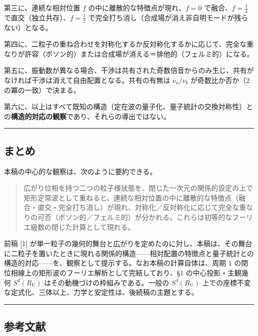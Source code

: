 \documentclass[
]{ltjsarticle}
\begin{document}
第三に、連続な相対位置 \(f\) の中に離散的な特徴点が現れ、\(f=0\)
で融合、\(f=\tfrac14\) で直交（独立共存）、\(f=\tfrac12\)
で完全打ち消し（合成場が消え非自明モードが残らない）となる。

第四に、二粒子の重ね合わせを対称化するか反対称化するかに応じて、完全な重なりが許容（ボソン的）または合成場が消える＝排他的（フェルミ的）になる。

第五に、振動数が異なる場合、干渉は共有された奇数倍音からのみ生じ、共有がなければ干渉は消えて自由配置となる。共有の有無は
\(\nu_a/\nu_b\) が奇数比か否か（\(2\) の冪の一致）で決まる。

第六に、以上はすべて既知の構造（定在波の量子化、量子統計の交換対称性）との\textbf{構造的対応の観察}であり、それらの導出ではない。

\begin{center}\rule{0.5\linewidth}{0.5pt}\end{center}

\subsection{まとめ}\label{ux307eux3068ux3081}

本稿の中心的な観察は、次のように要約できる。

\begin{quote}
広がり位相を持つ二つの粒子様状態を、閉じた一次元の関係的設定の上で矩形定常波として重ねると、連続な相対位置の中に離散的な特徴点（融合・直交・完全打ち消し）が現れ、対称化／反対称化に応じて完全な重なりの可否（ボソン的／フェルミ的）が分かれる。これらは初等的なフーリエ級数の閉じた計算として現れる。
\end{quote}

前稿 {[}1{]}
が単一粒子の幾何的舞台と広がりを定めたのに対し、本稿は、その舞台に二粒子を置いたときに現れる関係的構造------相対配置の特徴点と量子統計との構造的対応------を、観察として提示する。なお本稿の計算自体は、周期
\(1\) の閉位相線上の矩形波のフーリエ解析として完結しており、§1
の中心投影・主観幾何 \(S^4(R_{\mathrm U})\)
はその動機づけの枠組みである。一般の \(S^4(R_{\mathrm U})\)
上での座標不変な定式化、三体以上、力学と安定性は、後続稿の主題とする。

\begin{center}\rule{0.5\linewidth}{0.5pt}\end{center}

\subsection{参考文献}\label{ux53c2ux8003ux6587ux732e}
\end{document}
